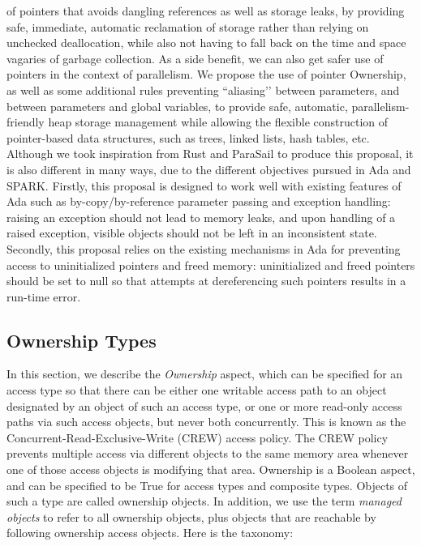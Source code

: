 \documentclass{llncs}
\begin{document}
of pointers that avoids dangling references as well as storage leaks, by providing safe, immediate, automatic reclamation of storage rather than relying on unchecked deallocation,
while also not having to fall back on the time and space vagaries of garbage collection.  As a side benefit, we can also get safer use of pointers in the context of parallelism.
We propose the use of pointer Ownership, as well as some additional rules preventing ``aliasing’’ between parameters, and between parameters and global variables, to provide safe,
automatic, parallelism-friendly heap storage management while allowing the flexible construction of pointer-based data structures, such as trees, linked lists, hash tables, etc.
Although we took inspiration from Rust and ParaSail to produce this proposal, it is also different in many ways, due to the different objectives pursued in Ada and SPARK. Firstly,
this proposal is designed to work well with existing features of Ada such as by-copy/by-reference parameter passing and exception handling: raising an exception should not lead to
memory leaks, and upon handling of a raised exception, visible objects should not be left in an inconsistent state. Secondly, this proposal relies on the existing mechanisms in Ada
for preventing access to uninitialized pointers and freed memory: uninitialized and freed pointers should be set to null so that attempts at dereferencing such pointers results in a run-time error.




\subsection{Ownership Types}
\label{sec:ownership}

In this section, we describe the \textit{Ownership} aspect, which can be specified for an access type so that there can be either one writable access path to an object
designated by an object of such an access type, or one or more read-only access paths via such access objects, but never both concurrently. This is known as
the Concurrent-Read-Exclusive-Write (CREW) access policy. The CREW policy prevents multiple access via different objects to the same memory area whenever one
of those access objects is modifying that area.
Ownership is a Boolean aspect, and can be specified to be True for access types and composite types.  Objects of such a type are called ownership objects.
In addition, we use the term \textit{managed objects} to refer to all ownership objects, plus objects that are reachable by following ownership access objects.
Here is the taxonomy:
\end{document}
